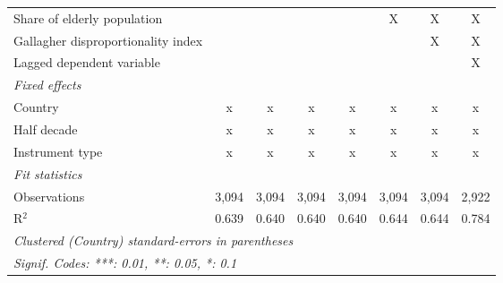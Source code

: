 \begin{tabular}{lccccccc}
   Share of elderly population                                            &               &               &               &              & X             & X             & X\\  
   Gallagher disproportionality index                                     &               &               &               &              &               & X             & X\\  
   Lagged dependent variable                                              &               &               &               &              &               &               & X\\  
   \emph{Fixed effects}\\
   Country                                                                & x             & x             & x             & x            & x             & x             & x\\  
   Half decade                                                            & x             & x             & x             & x            & x             & x             & x\\  
   Instrument type                                                        & x             & x             & x             & x            & x             & x             & x\\  
   \midrule \emph{Fit statistics}\\
   Observations                                                           & 3,094         & 3,094         & 3,094         & 3,094        & 3,094         & 3,094         & 2,922\\  
   R$^2$                                                                  & 0.639         & 0.640         & 0.640         & 0.640        & 0.644         & 0.644         & 0.784\\  
   \midrule
   \multicolumn{8}{l}{\emph{Clustered (Country) standard-errors in parentheses}}\\
   \multicolumn{8}{l}{\emph{Signif. Codes: ***: 0.01, **: 0.05, *: 0.1}}\\
\end{tabular}
\par\endgroup


